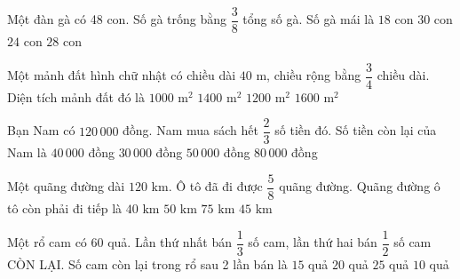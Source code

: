\begin{ex} %
Một đàn gà có 48 con. Số gà trống bằng $\dfrac{3}{8}$ tổng số gà. Số gà mái là
\choice
{$18$ con}
{\True $30$ con}
{$24$ con}
{$28$ con}
\end{ex}

\begin{ex} %
Một mảnh đất hình chữ nhật có chiều dài $40\text{ m}$, chiều rộng bằng $\dfrac{3}{4}$ chiều dài. Diện tích mảnh đất đó là
\choice
{$1000\text{ m}^2$}
{$1400\text{ m}^2$}
{\True $1200\text{ m}^2$}
{$1600\text{ m}^2$}
\end{ex}

\begin{ex} %
Bạn Nam có $120\,000$ đồng. Nam mua sách hết $\dfrac{2}{3}$ số tiền đó. Số tiền còn lại của Nam là
\choice
{\True $40\,000$ đồng}
{$30\,000$ đồng}
{$50\,000$ đồng}
{$80\,000$ đồng}
\end{ex}

\begin{ex} %
Một quãng đường dài $120\text{ km}$. Ô tô đã đi được $\dfrac{5}{8}$ quãng đường. Quãng đường ô tô còn phải đi tiếp là
\choice
{$40\text{ km}$}
{$50\text{ km}$}
{$75\text{ km}$}
{\True $45\text{ km}$}
\end{ex}

\begin{ex} %
Một rổ cam có 60 quả. Lần thứ nhất bán $\dfrac{1}{3}$ số cam, lần thứ hai bán $\dfrac{1}{2}$ số cam CÒN LẠI. Số cam còn lại trong rổ sau 2 lần bán là
\choice
{$15$ quả}
{\True $20$ quả}
{$25$ quả}
{$10$ quả}
\end{ex}

